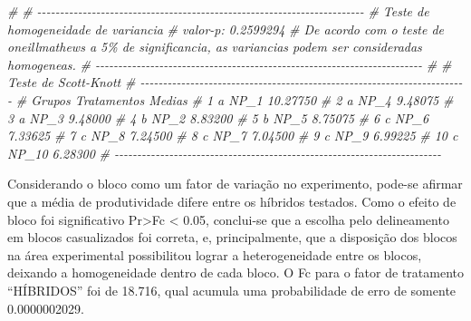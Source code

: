 \documentclass[
]{book}
\makeatletter
\newenvironment{Shaded}{\begin{snugshade}}{\end{snugshade}}
\newcommand{\CommentTok}[1]{\textcolor[rgb]{0.56,0.35,0.01}{\textit{#1}}}
\numberwithin{equation}{section}
\newcommand{\indf}[1]{\index[function]{#1@\texttt{#1()}|ST}}
\makeatother
\begin{document}
\begin{Shaded}
\begin{Highlighting}[]
\CommentTok{\# }
\CommentTok{\# {-}{-}{-}{-}{-}{-}{-}{-}{-}{-}{-}{-}{-}{-}{-}{-}{-}{-}{-}{-}{-}{-}{-}{-}{-}{-}{-}{-}{-}{-}{-}{-}{-}{-}{-}{-}{-}{-}{-}{-}{-}{-}{-}{-}{-}{-}{-}{-}{-}{-}{-}{-}{-}{-}{-}{-}{-}{-}{-}{-}{-}{-}{-}{-}{-}{-}{-}{-}{-}{-}{-}{-}}
\CommentTok{\# Teste de homogeneidade de variancia }
\CommentTok{\# valor{-}p:  0.2599294 }
\CommentTok{\# De acordo com o teste de oneillmathews a 5\% de significancia, as variancias podem ser consideradas homogeneas.}
\CommentTok{\# {-}{-}{-}{-}{-}{-}{-}{-}{-}{-}{-}{-}{-}{-}{-}{-}{-}{-}{-}{-}{-}{-}{-}{-}{-}{-}{-}{-}{-}{-}{-}{-}{-}{-}{-}{-}{-}{-}{-}{-}{-}{-}{-}{-}{-}{-}{-}{-}{-}{-}{-}{-}{-}{-}{-}{-}{-}{-}{-}{-}{-}{-}{-}{-}{-}{-}{-}{-}{-}{-}{-}{-}}
\CommentTok{\# }
\CommentTok{\# Teste de Scott{-}Knott}
\CommentTok{\# {-}{-}{-}{-}{-}{-}{-}{-}{-}{-}{-}{-}{-}{-}{-}{-}{-}{-}{-}{-}{-}{-}{-}{-}{-}{-}{-}{-}{-}{-}{-}{-}{-}{-}{-}{-}{-}{-}{-}{-}{-}{-}{-}{-}{-}{-}{-}{-}{-}{-}{-}{-}{-}{-}{-}{-}{-}{-}{-}{-}{-}{-}{-}{-}{-}{-}{-}{-}{-}{-}{-}{-}}
\CommentTok{\#    Grupos Tratamentos   Medias}
\CommentTok{\# 1       a        NP\_1 10.27750}
\CommentTok{\# 2       a        NP\_4  9.48075}
\CommentTok{\# 3       a        NP\_3  9.48000}
\CommentTok{\# 4       b        NP\_2  8.83200}
\CommentTok{\# 5       b        NP\_5  8.75075}
\CommentTok{\# 6       c        NP\_6  7.33625}
\CommentTok{\# 7       c        NP\_8  7.24500}
\CommentTok{\# 8       c        NP\_7  7.04500}
\CommentTok{\# 9       c        NP\_9  6.99225}
\CommentTok{\# 10      c       NP\_10  6.28300}
\CommentTok{\# {-}{-}{-}{-}{-}{-}{-}{-}{-}{-}{-}{-}{-}{-}{-}{-}{-}{-}{-}{-}{-}{-}{-}{-}{-}{-}{-}{-}{-}{-}{-}{-}{-}{-}{-}{-}{-}{-}{-}{-}{-}{-}{-}{-}{-}{-}{-}{-}{-}{-}{-}{-}{-}{-}{-}{-}{-}{-}{-}{-}{-}{-}{-}{-}{-}{-}{-}{-}{-}{-}{-}{-}}
\end{Highlighting}
\end{Shaded}

\indf{dbc}

Considerando o bloco como um fator de variação no experimento, pode-se afirmar que a média de produtividade difere entre os híbridos testados. Como o efeito de bloco foi significativo Pr\textgreater Fc \textless{} 0.05, conclui-se que a escolha pelo delineamento em blocos casualizados foi correta, e, principalmente, que a disposição dos blocos na área experimental possibilitou lograr a heterogeneidade entre os blocos, deixando a homogeneidade dentro de cada bloco. O Fc para o fator de tratamento ``HÍBRIDOS'' foi de 18.716, qual acumula uma probabilidade de erro de somente 0.0000002029.
\end{document}
